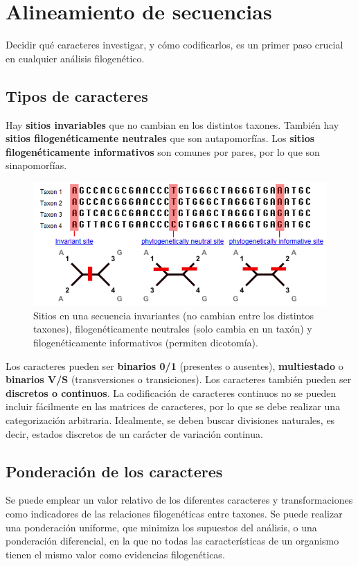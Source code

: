 \chapter{Alineamiento de secuencias}
Decidir qué caracteres investigar, y cómo codificarlos, es un primer paso crucial en cualquier análisis filogenético. 

\section{Tipos de caracteres}
Hay \textbf{sitios invariables} que no cambian en los distintos taxones. También hay \textbf{sitios filogenéticamente neutrales} que son autapomorfías. Los \textbf{sitios filogenéticamente informativos} son comunes por pares, por lo que son sinapomorfías. 

\begin{figure}[htbp]
\centering
\includegraphics[width=0.5\linewidth]{figs/sitios-informativos.png}
\caption{Sitios en una secuencia invariantes (no cambian entre los distintos taxones), filogenéticamente neutrales (solo cambia en un taxón) y filogenéticamente informativos (permiten dicotomía).}
\end{figure}

Los caracteres pueden ser \textbf{binarios 0/1} (presentes o ausentes), \textbf{multiestado} o \textbf{binarios V/S} (transversiones o transiciones). Los caracteres también pueden ser \textbf{discretos o continuos}. La codificación de caracteres continuos no se pueden incluir fácilmente en las matrices de caracteres, por lo que se debe realizar una categorización arbitraria. Idealmente, se deben buscar divisiones naturales, es decir, estados discretos de un carácter de variación continua. 

\section{Ponderación de los caracteres}
Se puede emplear un valor relativo de los diferentes caracteres y transformaciones como indicadores de las relaciones filogenéticas entre taxones. Se puede realizar una ponderación uniforme, que minimiza los supuestos del análisis, o una ponderación diferencial, en la que no todas las características de un organismo tienen el mismo valor como evidencias filogenéticas. 

